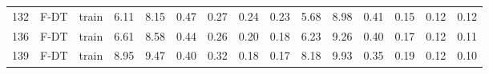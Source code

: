 \begin{table}
\begin{tabular}{@{\hskip3pt}c@{\hskip3pt}c@{\hskip3pt}c@{\hskip3pt}c@{\hskip3pt}c@{\hskip3pt}c@{\hskip3pt}c@{\hskip3pt}c@{\hskip3pt}c@{\hskip3pt}c@{\hskip3pt}c@{\hskip3pt}c@{\hskip3pt}c@{\hskip3pt}c@{\hskip3pt}c}
        132 &           F-DT &                     train &              6.11 &        8.15 &          0.47 &        0.27 &        0.24 &         0.23 &                5.68 &        8.98 &          0.41 &        0.15 &        0.12 &         0.12 \\
        136 &           F-DT &                     train &              6.61 &        8.58 &          0.44 &        0.26 &        0.20 &         0.18 &                6.23 &        9.26 &          0.40 &        0.17 &        0.12 &         0.11 \\
        139 &           F-DT &                     train &              8.95 &        9.47 &          0.40 &        0.32 &        0.18 &         0.17 &                8.18 &        9.93 &          0.35 &        0.19 &        0.12 &         0.10 \\
\bottomrule
\end{tabular}
\end{table}
